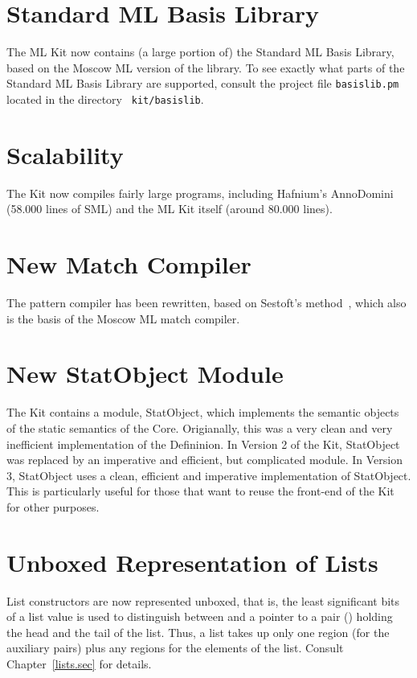 \documentclass[12pt]{book}
\begin{document}
\section{Standard ML Basis Library}
The ML Kit now contains (a large portion of) the 
Standard ML Basis
Library, based on the Moscow ML version of the library. To
see exactly what parts of the Standard ML Basis Library are supported, consult the
project file {\tt basislib.pm} located in the directory {\tt
  kit/basislib}. 

\section{Scalability}
The Kit now compiles fairly large programs, including Hafnium's AnnoDomini
(58.000 lines of SML) and the ML Kit itself (around 80.000 lines).

\section{New Match Compiler}
The pattern compiler has been rewritten, based on Sestoft's 
method~\cite{sestoft96}, which also is the basis of the Moscow ML 
match compiler. 

\section{New StatObject Module}
The Kit contains a module, StatObject,
which implements the semantic objects of the static semantics of
the Core. Origianally, this was a very clean and very inefficient
implementation of the Defininion. In Version 2 of the Kit, StatObject
was replaced by an imperative and efficient, but complicated module.
In Version 3, StatObject uses a clean, efficient and imperative 
implementation of StatObject. This is particularly useful for those that
want to reuse the front-end of the Kit for other purposes.

\section{Unboxed Representation of Lists}
 List constructors are now represented unboxed, that is,
the least significant bits of a list value is used to distinguish
between  and a pointer to a pair (\boxml{::}) holding the
head and the tail of the list. Thus, a list takes up only one region
(for the auxiliary pairs) plus any regions for the elements of the
list. Consult Chapter~\ref{lists.sec} for details.
\end{document}
